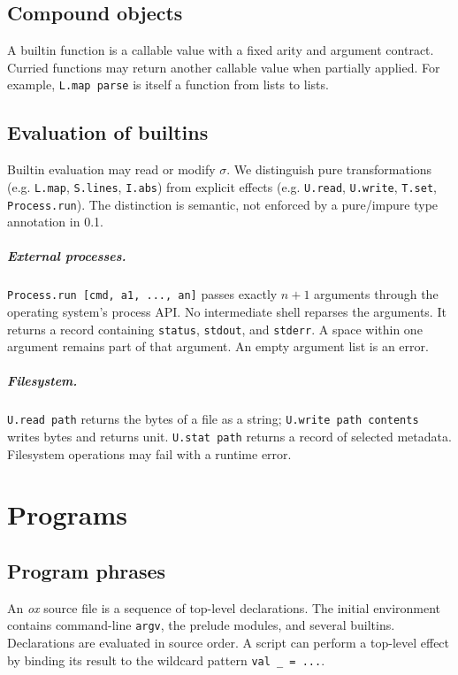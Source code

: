 \documentclass[11pt,oneside,openany]{book}
\newcommand{\ox}{\textit{ox}}
\newcommand{\kw}[1]{\texttt{#1}}
\newcommand{\state}{\sigma}
\begin{document}
\section{Compound objects}
A builtin function is a callable value with a fixed arity and argument contract. Curried functions may return another callable value when partially applied. For example, \kw{L.map parse} is itself a function from lists to lists.

\section{Evaluation of builtins}
Builtin evaluation may read or modify $\state$. We distinguish pure transformations (e.g. \kw{L.map}, \kw{S.lines}, \kw{I.abs}) from explicit effects (e.g. \kw{U.read}, \kw{U.write}, \kw{T.set}, \kw{Process.run}). The distinction is semantic, not enforced by a pure/impure type annotation in 0.1.

\paragraph{External processes.} \kw{Process.run [cmd, a1, ..., an]} passes exactly $n+1$ arguments through the operating system's process API. No intermediate shell reparses the arguments. It returns a record containing \kw{status}, \kw{stdout}, and \kw{stderr}. A space within one argument remains part of that argument. An empty argument list is an error.

\paragraph{Filesystem.} \kw{U.read path} returns the bytes of a file as a string; \kw{U.write path contents} writes bytes and returns unit. \kw{U.stat path} returns a record of selected metadata. Filesystem operations may fail with a runtime error.

\chapter{Programs}
\section{Program phrases}
An \ox{} source file is a sequence of top-level declarations. The initial environment contains command-line \kw{argv}, the prelude modules, and several builtins. Declarations are evaluated in source order. A script can perform a top-level effect by binding its result to the wildcard pattern \kw{val \_ = ...}.
\end{document}
